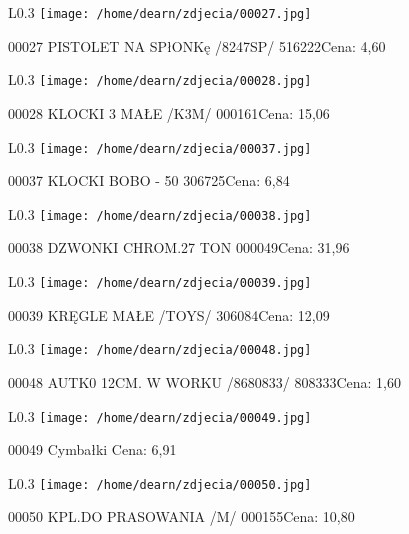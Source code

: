 \begin{wrapfigure}{L}{0.3\textwidth}
\texttt{[image: /home/dearn/zdjecia/00027.jpg]}
\end{wrapfigure}
00027 PISTOLET NA SPłONKę /8247SP/                    516222Cena: 4,60\newline
\begin{wrapfigure}{L}{0.3\textwidth}
\texttt{[image: /home/dearn/zdjecia/00028.jpg]}
\end{wrapfigure}
00028 KLOCKI 3 MAŁE /K3M/                             000161Cena: 15,06\newline
\begin{wrapfigure}{L}{0.3\textwidth}
\texttt{[image: /home/dearn/zdjecia/00037.jpg]}
\end{wrapfigure}
00037 KLOCKI BOBO -  50                               306725Cena: 6,84\newline
\begin{wrapfigure}{L}{0.3\textwidth}
\texttt{[image: /home/dearn/zdjecia/00038.jpg]}
\end{wrapfigure}
00038 DZWONKI CHROM.27 TON                            000049Cena: 31,96\newline
\begin{wrapfigure}{L}{0.3\textwidth}
\texttt{[image: /home/dearn/zdjecia/00039.jpg]}
\end{wrapfigure}
00039 KRĘGLE MAŁE /TOYS/                              306084Cena: 12,09\newline
\begin{wrapfigure}{L}{0.3\textwidth}
\texttt{[image: /home/dearn/zdjecia/00048.jpg]}
\end{wrapfigure}
00048 AUTK0 12CM. W WORKU /8680833/                   808333Cena: 1,60\newline
\begin{wrapfigure}{L}{0.3\textwidth}
\texttt{[image: /home/dearn/zdjecia/00049.jpg]}
\end{wrapfigure}
00049 Cymbałki Cena: 6,91\newline
\begin{wrapfigure}{L}{0.3\textwidth}
\texttt{[image: /home/dearn/zdjecia/00050.jpg]}
\end{wrapfigure}
00050 KPL.DO PRASOWANIA /M/                           000155Cena: 10,80\newline

